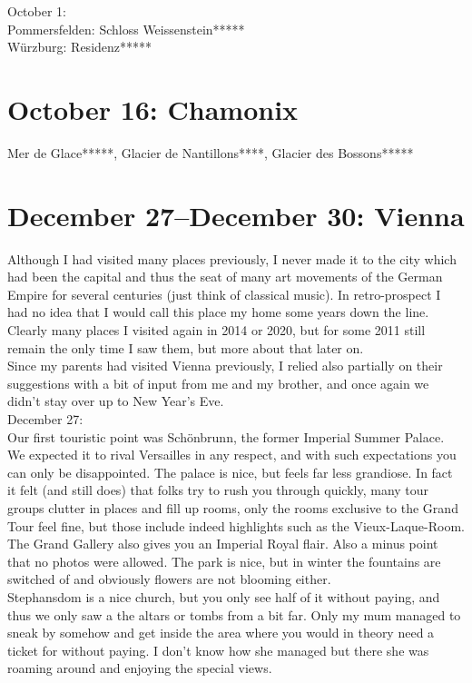 October 1:\\
Pommersfelden: Schloss Weissenstein*****\\
W\"urzburg: Residenz*****

\section{October 16: Chamonix}
\label{Chamonix2011}

Mer de Glace*****, Glacier de Nantillons****, Glacier des Bossons*****

\section{December 27--December 30: Vienna}
\label{Vienna2011}

Although I had visited many places previously, I never made it to the city which had been the capital and thus the seat of many art movements of the German Empire for several centuries (just think of classical music). In retro-prospect I had no idea that I would call this place my home some years down the line. Clearly many places I visited again in 2014 or 2020, but for some 2011 still remain the only time I saw them, but more about that later on.\\

Since my parents had visited Vienna previously, I relied also partially on their suggestions with a bit of input from me and my brother, and once again we didn't stay over up to New Year's Eve.\\

December 27:\\
Our first touristic point was Sch\"onbrunn, the former Imperial Summer Palace. We expected it to rival Versailles in any respect, and with such expectations you can only be disappointed. The palace is nice, but feels far less grandiose. In fact it felt (and still does) that folks try to rush you through quickly, many tour groups clutter in places and fill up rooms, only the rooms exclusive to the Grand Tour feel fine, but those include indeed highlights such as the Vieux-Laque-Room. The Grand Gallery also gives you an Imperial Royal flair. Also a minus point that no photos were allowed. The park is nice, but in winter the fountains are switched of and obviously flowers are not blooming either.\\
Stephansdom is a nice church, but you only see half of it without paying, and thus we only saw a the altars or tombs from a bit far. Only my mum managed to sneak by somehow and get inside the area where you would in theory need a ticket for without paying. I don't know how she managed but there she was roaming around and enjoying the special views.\\

